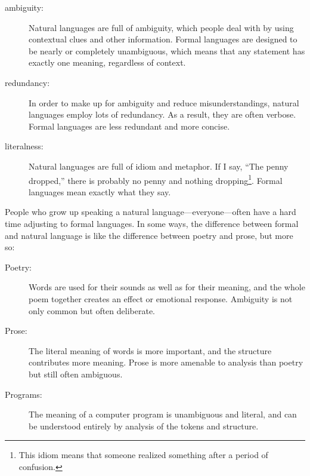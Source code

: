 \documentclass[10pt]{book}
\begin{document}

\begin{description}

\item[ambiguity:] Natural languages are full of ambiguity, which
people deal with by using contextual clues and other information.
Formal languages are designed to be nearly or completely unambiguous,
which means that any statement has exactly one meaning,
regardless of context.

\item[redundancy:] In order to make up for ambiguity and reduce
misunderstandings, natural languages employ lots of
redundancy.  As a result, they are often verbose.  Formal languages
are less redundant and more concise.

\item[literalness:] Natural languages are full of idiom and metaphor.
If I say, ``The penny dropped,'' there is probably no penny and
nothing dropping\footnote{This idiom means that someone realized something
after a period of confusion.}.  Formal languages
mean exactly what they say.

\end{description}

People who grow up speaking a natural language---everyone---often have a
hard time adjusting to formal languages.  In some ways, the difference
between formal and natural language is like the difference between
poetry and prose, but more so:


\begin{description}

\item[Poetry:] Words are used for their sounds as well as for
their meaning, and the whole poem together creates an effect or
emotional response.  Ambiguity is not only common but often
deliberate.

\item[Prose:] The literal meaning of words is more important,
and the structure contributes more meaning.  Prose is more amenable to
analysis than poetry but still often ambiguous.

\item[Programs:] The meaning of a computer program is unambiguous
and literal, and can be understood entirely by analysis of the
tokens and structure.

\end{description}
\end{document}
